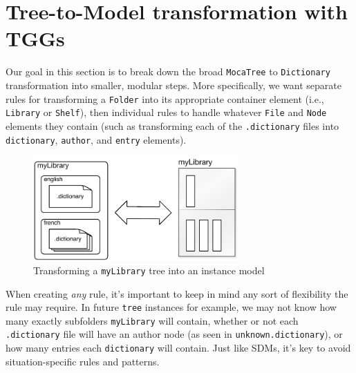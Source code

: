 \newpage
\section{Tree-to-Model transformation with TGGs}
\genHeader

Our goal in this section is to break down the broad \texttt{MocaTree} to \texttt{Dictionary} transformation into smaller, modular steps. More specifically, we
want separate rules for transforming a \texttt{Folder} into its appropriate container element (i.e., \texttt{Library} or \texttt{Shelf}), then individual rules
to handle whatever \texttt{File} and \texttt{Node} elements they contain (such as transforming each of the \texttt{.dictionary} files into
\texttt{dictionary}, \texttt{author}, and \texttt{entry} elements).

\vspace{0.5cm}

\begin{figure}[htp]
\begin{center}
  \includegraphics[width=0.7\textwidth]{transformationGoal}
  \caption{Transforming a \texttt{myLibrary} tree into an instance model}
  \label{fig:treeToDictionary}
\end{center}
\end{figure}

\vspace{0.5cm}

When creating \emph{any} rule, it's important to keep in mind any sort of flexibility the rule may require. In future \texttt{tree} instances for example, we
may not know how many exactly subfolders \texttt{myLibrary} will contain, whether or not each \texttt{.dictionary} file will have an author node (as seen in
\texttt{unknown.dictionary}), or how many entries each \texttt{dictionary} will contain. Just like SDMs, it's key to avoid situation-specific rules and
patterns.








